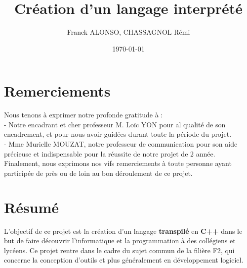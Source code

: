 \documentclass[a4paper]{article}%
\title{Création d'un langage interprété}
\author{Franck ALONSO, CHASSAGNOL Rémi}
\date{\today}
\begin{document}

\clearpage{}


\section*{Remerciements}

\doublespacing
\large %
Nous tenons à exprimer notre profonde gratitude à :\\
- Notre encadrant et cher professeur M. Loïc YON pour al qualité de son
  encadrement, et pour nous avoir guidées durant toute la période du projet.\\
- Mme Murielle MOUZAT, notre professeur de communication pour son aide précieuse
  et indispensable pour la réussite de notre projet de 2 année.\\

\noindent Finalement, nous exprimons nos vifs remerciements à toute personne
ayant participée de près ou de loin au bon déroulement de ce projet.

\normalsize
\onehalfspacing

\clearpage{}%

\thispagestyle{empty}
\tableofcontents
\clearpage{}%

\clearpage{}%



\setcounter{secnumdepth}{0}
\section{Résumé}
L'objectif de ce projet est la création d'un langage \textbf{transpilé} en
\textbf{C++} dans le but de faire découvrir l'informatique et la programmation à
des collégiens et lycéens. Ce projet rentre dans le cadre du sujet commun de la
filière F2, qui concerne la conception d’outils et plus généralement en
développement logiciel.
\end{document}
